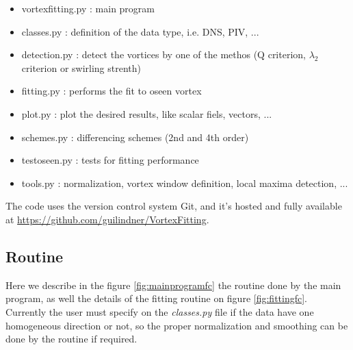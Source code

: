 \documentclass[12pt, a4paper, openany]{memoir}
\begin{document}
\begin{itemize}
	\item vortexfitting.py : main program
	\item classes.py : definition of the data type, i.e. DNS, PIV, ...
	\item detection.py : detect the vortices by one of the methos (Q criterion, $\lambda_2$ criterion or swirling strenth)
	\item fitting.py : performs the fit to oseen vortex
	\item plot.py : plot the desired results, like scalar fiels, vectors, ...
	\item schemes.py : differencing schemes (2nd and 4th order)
	\item testoseen.py : tests for fitting performance
	\item tools.py : normalization, vortex window definition, local maxima detection, ... 
\end{itemize}

The code uses the version control system Git, and it's hosted and fully available at \url{https://github.com/guilindner/VortexFitting}. 

\newpage
\subsection{Routine}

Here we describe in the figure \ref{fig:mainprogramfc} the routine done by the main program, as well the details of the fitting routine on figure \ref{fig:fittingfc}. Currently the user must specify on the \textit{classes.py} file if the data have one homogeneous direction or not, so the proper normalization and smoothing can be done by the routine if required.
\end{document}
